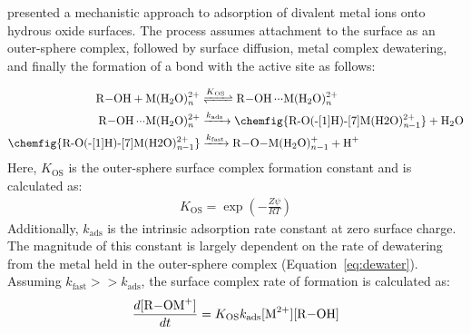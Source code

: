 \textcite{Stumm1992} presented a mechanistic approach to adsorption of divalent metal ions onto hydrous oxide surfaces. The process assumes attachment to the surface as an outer-sphere complex, followed by surface diffusion, metal complex dewatering, and finally the formation of a bond with the active site as follows:

\begin{align}
	\ce{R-OH + M(H2O)^2+_n &<=>[{$K$_{OS} }] R-OH \bond{...}M(H2O)^2+_n}\\
	\label{eq:dewater}
	\ce{R-OH \bond{...}M(H2O)^2+_n &->[{$k$_{ads} }]  \chemfig{R-O(-[1]H)-[7]{M(H2O)^{2+}_{\textit{n}-1}}} + H2O} \\
	\ce{ \chemfig{R-O(-[1]H)-[7]{M(H2O)^{2+}_{\textit{n}-1}}} &->[{$k$_{fast}}] R-O-M(H2O)^{+}_{n-1} + H+}
\end{align}
Here, $K_\textrm{OS}$ is the outer-sphere surface complex formation constant and is calculated as:
\begin{align}
	K_\textrm{OS} = \exp\left( -\frac{Z\psi}{RT}\right)
\end{align}
Additionally, $ k_\textrm{ads} $ is the intrinsic adsorption rate constant at zero surface charge. The magnitude of this constant is largely dependent on the rate of dewatering from the metal held in the outer-sphere complex (Equation~\ref{eq:dewater}). Assuming $k_\textrm{fast} >> k_\textrm{ads}$, the surface complex rate of formation is calculated as:
\begin{align}
	\frac{d[\ce{R-OM+}]}{dt} = K_\textrm{OS}k_\textrm{ads} \ce{[M^2+][R-OH]}
\end{align}

